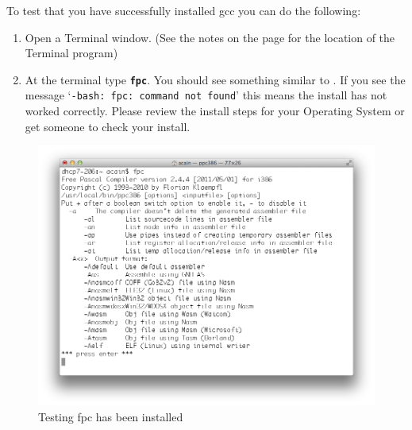 To test that you have successfully installed gcc you can do the following:
\begin{enumerate}
  \item Open a Terminal window. (See the notes on the  page for the location of the Terminal program)
  \item At the terminal type \textbf{\texttt{fpc}}. You should see something similar to . If you see the message `\texttt{-bash: fpc: command not found}' this means the install has not worked correctly. Please review the install steps for your Operating System or get someone to check your install.
\end{enumerate}

\begin{figure}[h]
   \centering
   \includegraphics[width=\textwidth]{./topics/programs-and-compilers/images/fpcInstall} 
   \caption{Testing fpc has been installed}
   \label{fig:gcc-install}
\end{figure}


